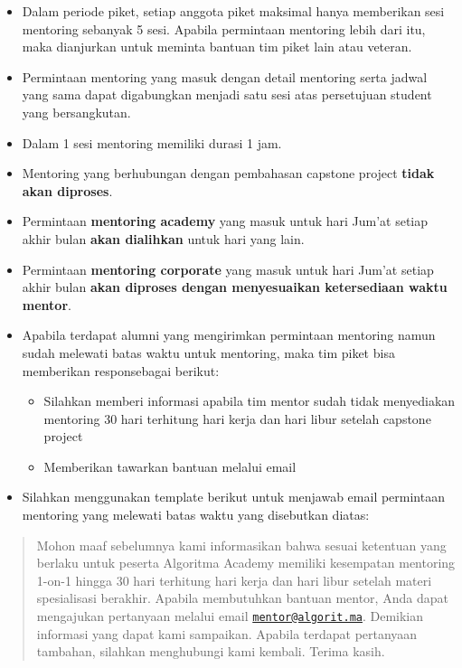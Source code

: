 \documentclass[
]{book}
\providecommand{\tightlist}{%
  \setlength{\itemsep}{0pt}\setlength{\parskip}{0pt}}
\begin{document}
\begin{itemize}
\tightlist
\item
  Dalam periode piket, setiap anggota piket maksimal hanya memberikan sesi mentoring sebanyak 5 sesi. Apabila permintaan mentoring lebih dari itu, maka dianjurkan untuk meminta bantuan tim piket lain atau veteran.
\item
  Permintaan mentoring yang masuk dengan detail mentoring serta jadwal yang sama dapat digabungkan menjadi satu sesi atas persetujuan student yang bersangkutan.
\item
  Dalam 1 sesi mentoring memiliki durasi 1 jam.
\item
  Mentoring yang berhubungan dengan pembahasan capstone project \textbf{tidak akan diproses}.
\item
  Permintaan \textbf{mentoring academy} yang masuk untuk hari Jum'at setiap akhir bulan \textbf{akan dialihkan} untuk hari yang lain.
\item
  Permintaan \textbf{mentoring corporate} yang masuk untuk hari Jum'at setiap akhir bulan \textbf{akan diproses dengan menyesuaikan ketersediaan waktu mentor}.
\item
  Apabila terdapat alumni yang mengirimkan permintaan mentoring namun sudah melewati batas waktu untuk mentoring, maka tim piket bisa memberikan responsebagai berikut:

  \begin{itemize}
  \tightlist
  \item
    Silahkan memberi informasi apabila tim mentor sudah tidak menyediakan mentoring 30 hari terhitung hari kerja dan hari libur setelah capstone project
  \item
    Memberikan tawarkan bantuan melalui email
  \end{itemize}
\item
  Silahkan menggunakan template berikut untuk menjawab email permintaan mentoring yang melewati batas waktu yang disebutkan diatas:
\end{itemize}

\begin{quote}
Mohon maaf sebelumnya kami informasikan bahwa sesuai ketentuan yang berlaku untuk peserta Algoritma Academy memiliki kesempatan mentoring 1-on-1 hingga 30 hari terhitung hari kerja dan hari libur setelah materi spesialisasi berakhir.
Apabila membutuhkan bantuan mentor, Anda dapat mengajukan pertanyaan melalui email \href{mailto:mentor@algorit.ma}{\nolinkurl{mentor@algorit.ma}}.
Demikian informasi yang dapat kami sampaikan. Apabila terdapat pertanyaan tambahan, silahkan menghubungi kami kembali. Terima kasih.
\end{quote}
\end{document}
